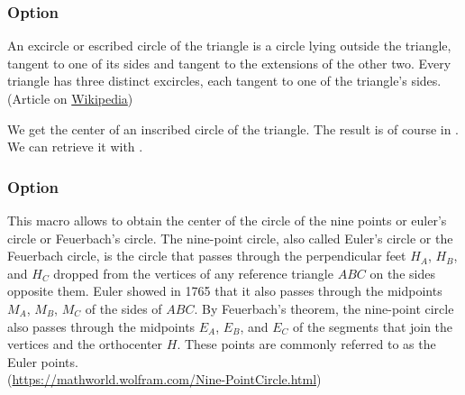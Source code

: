 \begin{tkzexample}[latex=8cm,small]
\end{tkzexample}

\subsubsection{Option }
An excircle or escribed circle of the triangle is a circle lying outside the triangle, tangent to one of its sides and tangent to the extensions of the other two. Every triangle has three distinct excircles, each tangent to one of the triangle's sides.\\
(Article on \href{https://en.wikipedia.org/wiki/Incircle_and_excircles_of_a_triangle}{Wikipedia})


 We get the center of an inscribed circle of the triangle. The result is of course in . We can retrieve it with .

\begin{tkzexample}[latex=7cm,small]
\end{tkzexample}

\subsubsection{Option }
This macro allows to obtain the center of the circle of the nine points or euler's circle or Feuerbach's circle. The nine-point circle, also called Euler's circle or the Feuerbach circle, is the circle that passes through the perpendicular feet $H_A$, $H_B$, and $H_C$ dropped from the vertices of any reference triangle $ABC$ on the sides opposite them. Euler showed in 1765 that it also passes through the midpoints $M_A$, $M_B$, $M_C$ of the sides of $ABC$. By Feuerbach's theorem, the nine-point circle also passes through the midpoints $E_A$, $E_B$, and $E_C$ of the segments that join the vertices and the orthocenter $H$. These points are commonly referred to as the Euler points.\\ (\url{https://mathworld.wolfram.com/Nine-PointCircle.html})

